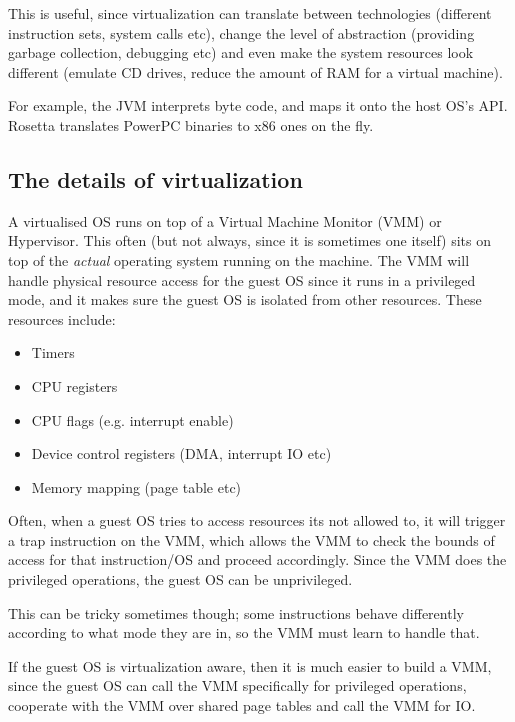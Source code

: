 This is useful, since virtualization can translate between technologies
(different instruction sets, system calls etc), change the level of abstraction
(providing garbage collection, debugging etc) and even make the system resources
look different (emulate CD drives, reduce the amount of RAM for a virtual
machine).

For example, the JVM interprets byte code, and maps it onto the host OS's API.
Rosetta translates PowerPC binaries to x86 ones on the fly.

\subsection{The details of virtualization}

A virtualised OS runs on top of a Virtual Machine Monitor (VMM) or Hypervisor.
This often (but not always, since it is sometimes one itself) sits on top of the
\textit{actual} operating system running on the machine. The VMM will handle
physical resource access for the guest OS since it runs in a privileged mode,
and it makes sure the guest OS is isolated from other resources. These resources
include:

\begin{mymulticols}
  \begin{itemize}
    \item Timers
    \item CPU registers
    \item CPU flags (e.g. interrupt enable)
    \item Device control registers (DMA, interrupt IO etc)
    \item Memory mapping (page table etc)
  \end{itemize}
\end{mymulticols}

Often, when a guest OS tries to access resources its not allowed to, it will
trigger a trap instruction on the VMM, which allows the VMM to check the bounds
of access for that instruction/OS and proceed accordingly. Since the VMM does
the privileged operations, the guest OS can be unprivileged.

This can be tricky sometimes though; some instructions behave differently
according to what mode they are in, so the VMM must learn to handle that.

If the guest OS is virtualization aware, then it is much easier to build a VMM,
since the guest OS can call the VMM specifically for privileged operations,
cooperate with the VMM over shared page tables and call the VMM for IO.


